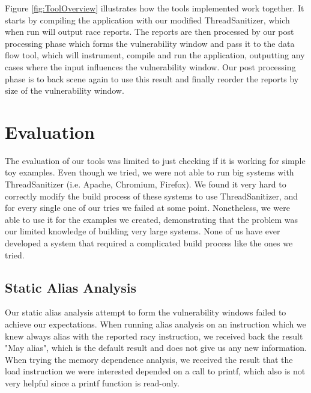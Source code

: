 \documentclass{acm_proc_article-sp}
\begin{document}
Figure \ref{fig:ToolOverview} illustrates how the tools implemented work together. It starts by compiling the application with our modified ThreadSanitizer, which when run will output race reports. The reports are then processed by our post processing phase which forms the vulnerability window and pass it to the data flow tool, which will instrument, compile and run the application, outputting any cases where the input influences the vulnerability window. Our post processing phase is to back scene again to use this result and finally reorder the reports by size of the vulnerability window.

\begin{figure*}
\centering
{}
\caption{Tool Overview}
\label{fig:ToolOverview}
\end{figure*}


\section{Evaluation}

The evaluation of our tools was limited to just checking if it is working for simple toy examples. Even though we tried, we were not able to run big systems with ThreadSanitizer (i.e. Apache, Chromium, Firefox). We found it very hard to correctly modify the build process of these systems to use ThreadSanitizer, and for every single one of our tries we failed at some point. Nonetheless, we were able to use it for the examples we created, demonstrating that the problem was our limited knowledge of building very large systems. None of us have ever developed a system that required a complicated build process like the ones we tried.

\subsection{Static Alias Analysis}

Our static alias analysis attempt to form the vulnerability windows failed to achieve our expectations. When running alias analysis on an instruction which we knew always alias with the reported racy instruction, we received back the result "May alias", which is the default result and does not give us any new information. When trying the memory dependence analysis, we received the result that the load instruction we were interested depended on a call to printf, which also is not very helpful since a printf function is read-only.
\end{document}
